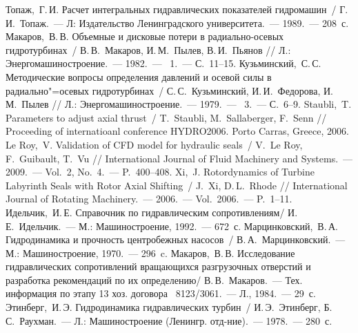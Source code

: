 \begin{thebibliography}{999}
%
\Rus
{} Топаж,~Г.\,И. Расчет интегральных гидравлических показателей гидромашин~/ Г.\,И.~Топаж.~--- 
                Л: Издательство Ленинградского университета.~--- 1989.~--- 208~с.
%
\Rus
{} Макаров,~В.\,В. Объемные и дисковые потери в радиально-осевых 
                    гидротурбинах~/ В.\,В.~Макаров, И.\,М.~Пылев, В.\,И.~Пьянов // Л.: 
                    Энергомашиностроение.~--- 1982.~--- \No~1.~--- С.~11--15.
%
\Rus
{} Кузьминский,~С.\,С. Методические вопросы определения давлений и осевой силы в 
                   радиально"=осевых гидротурбинах~/ С.\,С.~Кузьминский, И.\,И.~Федорова, И.\,М.~Пылев 
                   // Л.: Энергомашиностроение.~--- 1979.~--- \No~3.~--- С.~6--9.
%
\Eng
{}  Staubli,~T. Parameters to adjust axial thrust~/ T.~Staubli, M.~Sallaberger, F.~Senn // 
                   Proceeding of internatioanl conference HYDRO2006. Porto Carras, Greece, 2006.
%
\Eng
{} Le Roy,~V. Validation of CFD model for hydraulic seals~/ V.~Le Roy, F.~Guibault, T.~Vu // 
                 International Journal of Fluid Machinery and Systems.~--- 2009.~--- Vol.~2, No.~4.~--- 
                 P.~400--408.
%
\Eng
{} Xi,~J. Rotordynamics of Turbine Labyrinth Seals with Rotor Axial 
                   Shifting~/ J.~Xi, D.\,L.~Rhode // International Journal of Rotating 
                   Machinery.~--- 2006.~--- Vol.~2006.~--- P.~1--11.
%
\Rus
{} Идельчик,~И.\,Е. Справочник по гидравлическим сопротивлениям/ И.\,Е.~Идельчик.~--- 
                   М.: Машиностроение, 1992.~--- 672~с.
%
\Rus
{} Марцинковский,~В.\,А. Гидродинамика и прочность центробежных насосов~/ 
                        В.\,А.~Марцинковский.~--- М.: Машиностроение, 1970.~--- 296~c.
%
\Rus
{} Макаров,~В.\,В. Исследование гидравлических сопротивлений вращающихся разгрузочных отверстий 
                и разработка рекомендаций по их определению/ В.\,В.~Макаров.~--- Тех. информация по этапу 13 
                хоз. договора \No~8123/3061.~--- Л., 1984.~--- 29~с. 
%
\Rus
{} Этинберг,~И.\,Э. Гидродинамика гидравлических турбин~/ И.\,Э.~Этинберг, Б.\,С.~Раухман.~--- 
                   Л.: Машиностроение (Ленингр. отд-ние).~--- 1978.~--- 280~с.
%

\end{thebibliography}
